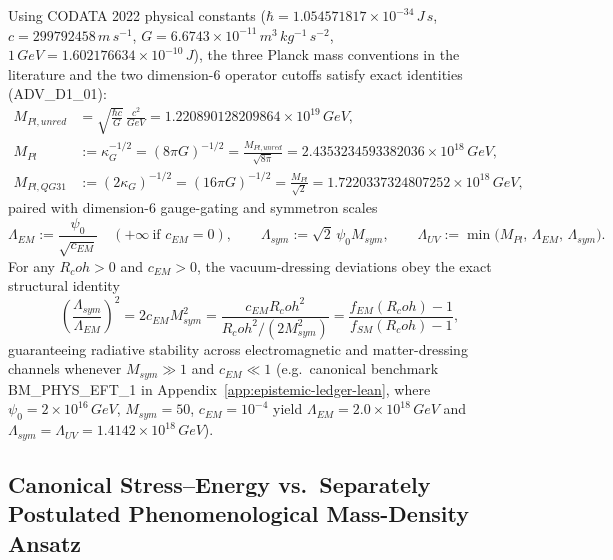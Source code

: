 \documentclass[american,11pt,letterpaper]{article}
\newcommand{\Rcoh}{R_{\mathrm{coh}}}
\def\mathrm#1{#1}%
\def\texttt#1{#1}%
\def\Rcoh{R_coh}%
\begin{document}
Using CODATA 2022 physical constants ($\hbar = 1.054571817\times 10^{-34}\,\mathrm{J\,s}$, $c = 299792458\,\mathrm{m\,s^{-1}}$, $G = 6.6743\times 10^{-11}\,\mathrm{m^3\,kg^{-1}\,s^{-2}}$, $1\,\mathrm{GeV} = 1.602176634\times 10^{-10}\,\mathrm{J}$), the three Planck mass conventions in the literature and the two dimension-6 operator cutoffs satisfy exact identities (\texttt{ADV\_D1\_01}):
\begin{align}
M_{\mathrm{Pl,unred}} &= \sqrt{\frac{\hbar c}{G}}\,\frac{c^2}{\mathrm{GeV}} = 1.220890128209864\times 10^{19}\,\mathrm{GeV}, \nonumber\\
M_{\mathrm{Pl}} &:= \kappa_G^{-1/2} = (8\pi G)^{-1/2} = \frac{M_{\mathrm{Pl,unred}}}{\sqrt{8\pi}} = 2.4353234593382036\times 10^{18}\,\mathrm{GeV}, \label{eq:Planck_scales_crosswalk}\\
M_{\mathrm{Pl,QG31}} &:= (2\kappa_G)^{-1/2} = (16\pi G)^{-1/2} = \frac{M_{\mathrm{Pl}}}{\sqrt{2}} = 1.7220337324807252\times 10^{18}\,\mathrm{GeV}, \nonumber
\end{align}
paired with dimension-6 gauge-gating and symmetron scales
\begin{equation}
\Lambda_{\mathrm{EM}} := \frac{\psi_0}{\sqrt{c_{\mathrm{EM}}}} \quad (+\infty\ \text{if } c_{\mathrm{EM}}=0),
\qquad
\Lambda_{\mathrm{sym}} := \sqrt{2}\,\psi_0 M_{\mathrm{sym}},
\qquad
\Lambda_{\mathrm{UV}} := \min\bigl(M_{\mathrm{Pl}},\,\Lambda_{\mathrm{EM}},\,\Lambda_{\mathrm{sym}}\bigr).
\label{eq:Lambda_UV_ceiling}
\end{equation}
For any $\Rcoh > 0$ and $c_{\mathrm{EM}} > 0$, the vacuum-dressing deviations obey the exact structural identity
\begin{equation}
\left(\frac{\Lambda_{\mathrm{sym}}}{\Lambda_{\mathrm{EM}}}\right)^2
= 2 c_{\mathrm{EM}} M_{\mathrm{sym}}^2
= \frac{c_{\mathrm{EM}}\Rcoh^2}{\Rcoh^2 / (2 M_{\mathrm{sym}}^2)}
= \frac{f_{\mathrm{EM}}(\Rcoh) - 1}{f_{\mathrm{SM}}(\Rcoh) - 1},
\label{eq:cutoff_ratio_identity}
\end{equation}
guaranteeing radiative stability across electromagnetic and matter-dressing channels whenever $M_{\mathrm{sym}} \gg 1$ and $c_{\mathrm{EM}} \ll 1$ (e.g.\ canonical benchmark \texttt{BM\_PHYS\_EFT\_1} in Appendix~\ref{app:epistemic-ledger-lean}, where $\psi_0 = 2\times 10^{16}\,\mathrm{GeV}$, $M_{\mathrm{sym}} = 50$, $c_{\mathrm{EM}} = 10^{-4}$ yield $\Lambda_{\mathrm{EM}} = 2.0\times 10^{18}\,\mathrm{GeV}$ and $\Lambda_{\mathrm{sym}} = \Lambda_{\mathrm{UV}} = 1.4142\times 10^{18}\,\mathrm{GeV}$).

\subsection{Canonical Stress--Energy vs.\ Separately Postulated Phenomenological Mass-Density Ansatz}
\end{document}
